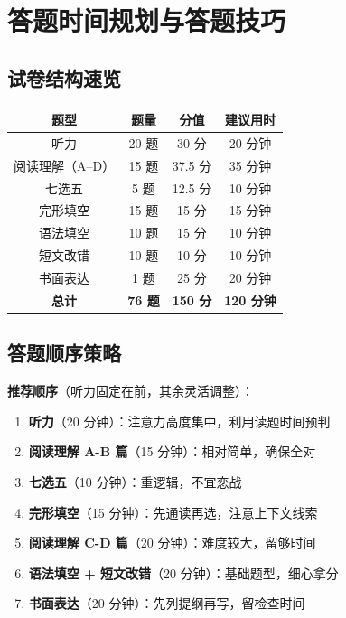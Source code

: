 \section{答题时间规划与答题技巧}

\subsection{试卷结构速览}

\begin{center}
\begin{tabular}{c|c|c|c}
\textbf{题型} & \textbf{题量} & \textbf{分值} & \textbf{建议用时} \\ \toprule
听力 & 20 题 & 30 分 & 20 分钟 \\
阅读理解（A--D） & 15 题 & 37.5 分 & 35 分钟 \\
七选五 & 5 题 & 12.5 分 & 10 分钟 \\
完形填空 & 15 题 & 15 分 & 15 分钟 \\
语法填空 & 10 题 & 15 分 & 10 分钟 \\
短文改错 & 10 题 & 10 分 & 10 分钟 \\
书面表达 & 1 题 & 25 分 & 20 分钟 \\ \hline
\textbf{总计} & \textbf{76 题} & \textbf{150 分} & \textbf{120 分钟}
\end{tabular}
\end{center}

\subsection{答题顺序策略}

\textbf{推荐顺序}（听力固定在前，其余灵活调整）：

\begin{enumerate}
  \item \textbf{听力}（20 分钟）：注意力高度集中，利用读题时间预判
  \item \textbf{阅读理解 A-B 篇}（15 分钟）：相对简单，确保全对
  \item \textbf{七选五}（10 分钟）：重逻辑，不宜恋战
  \item \textbf{完形填空}（15 分钟）：先通读再选，注意上下文线索
  \item \textbf{阅读理解 C-D 篇}（20 分钟）：难度较大，留够时间
  \item \textbf{语法填空 + 短文改错}（20 分钟）：基础题型，细心拿分
  \item \textbf{书面表达}（20 分钟）：先列提纲再写，留检查时间
\end{enumerate}

